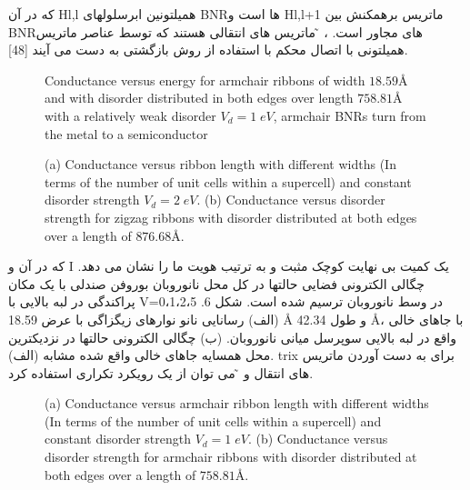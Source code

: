 که در آن Hl,l همیلتونین ابرسلولهای BNRها است و Hl,l+1 ماتریس برهمکنش بین BNRهای مجاور است. ، ̃ ماتریس های انتقالی هستند که توسط عناصر ماتریس همیلتونی با اتصال محکم با استفاده از روش بازگشتی به دست می آیند [48].

\begin{figure}[!ht]
    \centering
      
      \caption{Conductance versus energy for armchair ribbons of width $18.59$\AA
      and with disorder distributed in both edges over length $758.81$\AA
       with a relatively weak disorder $V_d=1\;eV$, armchair BNRs turn from the metal to a semiconductor}
      \label{armdisorder}
    \end{figure}
    
    \begin{figure}[!ht]
      \centering
      
      \caption{(a) Conductance versus ribbon length with different widths (In terms of the number of unit cells within a supercell)
      and constant disorder strength $V_d=2\;eV$.
      (b) Conductance versus disorder strength for zigzag ribbons with disorder distributed at both edges over a length of $876.68$\AA.}
      \label{zigzag-width-strangth}
    \end{figure}
    
که در آن و I یک کمیت بی نهایت کوچک مثبت و به ترتیب هویت ما را نشان می دهد. چگالی الکترونی فضایی حالتها در کل محل نانوروبان بوروفن صندلی با یک مکان پراکندگی در لبه بالایی با V=0،1،2،5 در وسط نانوروبان ترسیم شده است. شکل 6. (الف) رسانایی نانو نوارهای زیگزاگی با عرض 18.59 Å و طول 42.34 Å، با جاهای خالی واقع در لبه بالایی سوپرسل میانی نانوروبان. (ب) چگالی الکترونی حالتها در نزدیکترین محل همسایه جاهای خالی واقع شده مشابه (الف). trix برای به دست آوردن ماتریس های انتقال و ̃ می توان از یک رویکرد تکراری استفاده کرد.

\begin{figure}[!ht]
    \centering
    
    \caption{(a) Conductance versus armchair ribbon length with different widths (In terms of the number of unit cells within a supercell)
    and constant disorder strength $V_d=1\;eV$.
    (b) Conductance versus disorder strength for armchair ribbons with disorder distributed at both edges over a length of $758.81$\AA.}
    \label{armchair-width-strangth}
  \end{figure}
  
